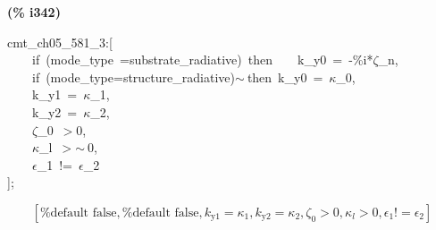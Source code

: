 \documentclass[fleqn]{article}
\begin{document}
\noindent
\begin{minipage}[t]{4.000000em}\color{red}\bfseries
(\% i342)	
\end{minipage}
\begin{minipage}[t]{\textwidth}\color{blue}
cmt\_ch05\_581\_3:[\\
\ \ \ \ if\ (mode\_type\ =substrate\_radiative)\ then\ \ \ \ k\_y0\ =\ -\%i*\ensuremath{\zeta}\_n,\\
\ \ \ \ if\ (mode\_type=structure\_radiative)\ensuremath{\sim\ }then\ k\_y0\ =\ \ensuremath{\kappa}\_0,\\
\ \ \ \ k\_y1\ =\ \ensuremath{\kappa}\_1,\\
\ \ \ \ k\_y2\ =\ \ensuremath{\kappa}\_2,\\
\ \ \ \ \ensuremath{\zeta}\_0\ \ensuremath{>}0,\\
\ \ \ \ \ensuremath{\kappa}\_l\ \ensuremath{>}\ensuremath{\sim\ }0,\\
\ \ \ \ \ensuremath{\epsilon}\_1\ !=\ \ensuremath{\epsilon}\_2\\
];
\end{minipage}
\[\displaystyle \tag{\% o342} 
\left[ \mbox{%
false}\operatorname{,}\mbox{%
false}\operatorname{,}{k_{\ensuremath{\mathrm{y1}}}}={{\kappa }_1}\operatorname{,}{k_{\ensuremath{\mathrm{y2}}}}={{\kappa }_2}\operatorname{,}{{\zeta }_0}\operatorname{>  }0\operatorname{,}{{\kappa }_l}\operatorname{>  }0\operatorname{,}{{\epsilon }_1}\operatorname{!}={{\epsilon }_2}\right] \mbox{}
\]
\end{document}
